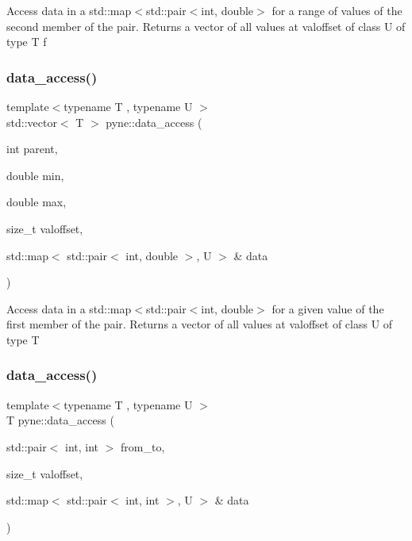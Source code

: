 Access data in a std\+::map$<$std\+::pair$<$int, double$>$ for a range of values of the second member of the pair. Returns a vector of all values at valoffset of class U of type T f \mbox{\label{namespacepyne_a1055e5c9a261d8f8490f8ebf1172e95d}} 
\subsubsection{\texorpdfstring{data\+\_\+access()}{data\_access()}\hspace{0.1cm}{\footnotesize\ttfamily [2/5]}}
{\footnotesize\ttfamily template$<$typename T , typename U $>$ \\
std\+::vector$<$ T $>$ pyne\+::data\+\_\+access (\begin{DoxyParamCaption}\item[{int}]{parent,  }\item[{double}]{min,  }\item[{double}]{max,  }\item[{size\+\_\+t}]{valoffset,  }\item[{std\+::map$<$ std\+::pair$<$ int, double $>$, U $>$ \&}]{data }\end{DoxyParamCaption})}

Access data in a std\+::map$<$std\+::pair$<$int, double$>$ for a given value of the first member of the pair. Returns a vector of all values at valoffset of class U of type T \mbox{\label{namespacepyne_aa1373c97baba4a611ac69e8f672ff9c6}} 
\subsubsection{\texorpdfstring{data\+\_\+access()}{data\_access()}\hspace{0.1cm}{\footnotesize\ttfamily [3/5]}}
{\footnotesize\ttfamily template$<$typename T , typename U $>$ \\
T pyne\+::data\+\_\+access (\begin{DoxyParamCaption}\item[{std\+::pair$<$ int, int $>$}]{from\+\_\+to,  }\item[{size\+\_\+t}]{valoffset,  }\item[{std\+::map$<$ std\+::pair$<$ int, int $>$, U $>$ \&}]{data }\end{DoxyParamCaption})}

